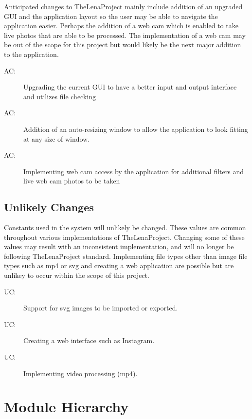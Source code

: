 \documentclass[12pt, titlepage]{article}
\newcounter{acnum}
\newcommand{\actheacnum}{AC\theacnum}
\newcounter{ucnum}
\newcommand{\uctheucnum}{UC\theucnum}
\begin{document}
Anticipated changes to TheLenaProject mainly include addition of an upgraded GUI and the application layout so the user may be able to navigate the application easier. Perhaps the addition of a web cam which is enabled to take live photos that are able to be processed. The implementation of a web cam may be out of the scope for this project but would likely be the next major addition to the application.

\begin{description}
\item[ \actheacnum \label{acHardware}:] Upgrading the current GUI to have a better input and output interface and utilizes file checking
\item[ \actheacnum \label{acInput}:] Addition of an auto-resizing window to allow the application to look fitting at any size of window.
\item[ \actheacnum \label{acInput}:] Implementing web cam access by the application for additional filters and live web cam photos to be taken
\end{description}

\subsection{Unlikely Changes} \label{SecUchange}

Constants used in the system will unlikely be changed. These values are common throughout
various implementations of TheLenaProject. Changing some of these values may result with an
inconsistent implementation, and will no longer be following TheLenaProject standard. Implementing file types other than image file types such as mp4 or svg and creating a web application are possible but are unlikey to occur within the scope of this project.
\\

\begin{description}
\item[ \uctheucnum \label{ucIO}:] Support for svg images to be imported or exported.
\item[ \uctheucnum \label{ucInput}:] Creating a web interface such as Instagram.
\item[ \uctheucnum \label{ucInput}:] Implementing video processing (mp4).
\end{description}

\section{Module Hierarchy} \label{SecMH}
\end{document}
